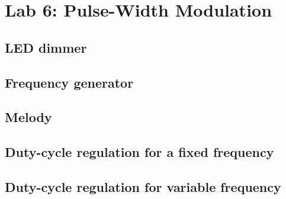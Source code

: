 \chapter{Lab 6: Pulse-Width Modulation} \label{day6}

\section{LED dimmer}





\section{Frequency generator}





\section{Melody}



\section{Duty-cycle regulation for a fixed frequency}



\section{Duty-cycle regulation for variable frequency}

